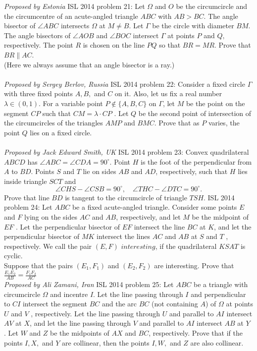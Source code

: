 \textit{Proposed by Estonia} 
ISL 2014 problem 21:  Let $\Omega$ and $O$ be the circumcircle and the circumcentre of an acute-angled triangle $ABC$ with $AB > BC$. The angle bisector of $\angle ABC$ intersects $\Omega$ at $M \ne B$. Let $\Gamma$ be the circle with diameter $BM$. The angle bisectors of $\angle AOB$ and $\angle BOC$ intersect $\Gamma$ at points $P$ and $Q,$ respectively. The point $R$ is chosen on the line $P Q$ so that $BR = MR$. Prove that $BR\parallel AC$. \\
(Here we always assume that an angle bisector is a ray.) \\\\
\textit{Proposed by Sergey Berlov, Russia} 
ISL 2014 problem 22:  Consider a fixed circle $\Gamma$ with three fixed points $A, B,$ and $C$ on it. Also, let us fix a real number $\lambda \in(0,1)$. For a variable point $P \not\in\{A, B, C\}$ on $\Gamma$, let $M$ be the point on the segment $CP$ such that $CM =\lambda\cdot  CP$ . Let $Q$ be the second point of intersection of the circumcircles of the triangles $AMP$ and $BMC$. Prove that as $P$ varies, the point $Q$ lies on a fixed circle. \\\\
\textit{Proposed by Jack Edward Smith, UK} 
ISL 2014 problem 23:  Convex quadrilateral $ABCD$ has $\angle ABC = \angle CDA = 90^{\circ}$. Point $H$ is the foot of the perpendicular from $A$ to $BD$. Points $S$ and $T$ lie on sides $AB$ and $AD$, respectively, such that $H$ lies inside triangle $SCT$ and
\[ \angle CHS - \angle CSB = 90^{\circ}, \quad \angle THC - \angle DTC = 90^{\circ}. \]
Prove that line $BD$ is tangent to the circumcircle of triangle $TSH$. 
ISL 2014 problem 24:  Let $ABC$ be a fixed acute-angled triangle. Consider some points $E$ and $F$ lying on the sides $AC$ and $AB$, respectively, and let $M$ be the midpoint of $EF$ . Let the perpendicular bisector of $EF$ intersect the line $BC$ at $K$, and let the perpendicular bisector of $MK$ intersect the lines $AC$ and $AB$ at $S$ and $T$ , respectively. We call the pair $(E, F )$ $\textit{interesting}$, if the quadrilateral $KSAT$ is cyclic. \\
Suppose that the pairs $(E_1 , F_1 )$ and $(E_2 , F_2 )$ are interesting. Prove that $\displaystyle\frac{E_1 E_2}{AB}=\frac{F_1 F_2}{AC}$ \\
\textit{Proposed by Ali Zamani, Iran} 
ISL 2014 problem 25:  Let $ABC$ be a triangle with circumcircle $\Omega$ and incentre $I$. Let the line passing through $I$ and perpendicular to $CI$ intersect the segment $BC$ and the arc $BC$ (not containing $A$) of $\Omega$ at points $U$ and $V$ , respectively. Let the line passing through $U$ and parallel to $AI$ intersect $AV$ at $X$, and let the line passing through $V$ and parallel to $AI$ intersect $AB$ at $Y$ . Let $W$ and $Z$ be the midpoints of $AX$ and $BC$, respectively. Prove that if the points $I, X,$ and $Y$ are collinear, then the points $I, W ,$ and $Z$ are also collinear. \\\\
